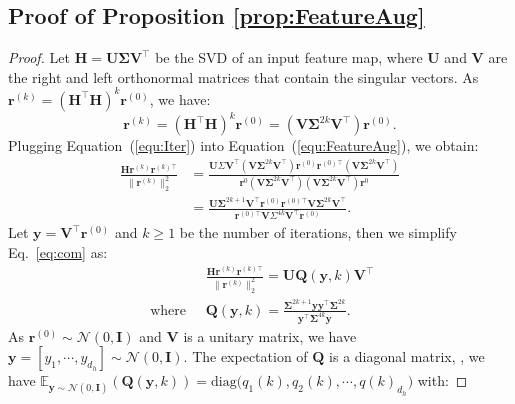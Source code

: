\setcounter{subsection}{1}
\subsection{Proof of Proposition \ref{prop:FeatureAug}}

\begin{proof}
Let $\mathbf{H} = \mathbf{U} \boldsymbol{\Sigma} \mathbf{V}^{\top}$ be the SVD of an input feature map, where $\mathbf{U}$ and $\mathbf{V}$ are the right and left orthonormal matrices that contain the singular vectors. As $\mathbf{r}^{(k)} = (\mathbf{H}^\top\mathbf{H})^k\mathbf{r}^{(0)}$, we have: %
\begin{equation}
    \mathbf{r}^{(k)} = (\mathbf{H}^\top\mathbf{H})^{k}\mathbf{r}^{(0)} = (\mathbf{V}\boldsymbol{\Sigma}^{2k} \mathbf{V}^{\top})\mathbf{r}^{(0)}.
    \label{equ:Iter}
\end{equation}
Plugging Equation~(\ref{equ:Iter}) into Equation~(\ref{equ:FeatureAug}), we obtain:
\begin{equation}
\begin{aligned}
        \!\!\!\!\frac{\mathbf{H} \mathbf{r}^{(k)} \mathbf{r}^{(k)\top}}{\|\mathbf{r}^{(k)}\|_2^2} &\!=\! \frac{\mathbf{U}\Sigma\mathbf{V}^\top (\mathbf{V}\boldsymbol{\Sigma}^{2k} \mathbf{V}^{\top})\mathbf{r}^{(0)} \mathbf{r}^{(0)\top}(\mathbf{V}\boldsymbol{\Sigma}^{2k} \mathbf{V}^{\top})}{\mathbf{r}^{0}(\mathbf{V}\boldsymbol{\Sigma}^{2k} \mathbf{V}^{\top})(\mathbf{V}\boldsymbol{\Sigma}^{2k} \mathbf{V}^{\top})\mathbf{r}^{0}}\\
        &\!=\! \frac{\mathbf{U}\boldsymbol{\Sigma}^{2k+1} \mathbf{V}^{\top}\mathbf{r}^{(0)} \mathbf{r}^{(0)\top}\mathbf{V}\boldsymbol{\Sigma}^{2k} \mathbf{V}^{\top}}{\mathbf{r}^{(0)\top}\mathbf{V} \Sigma^{4k} \mathbf{V}^{\top}\mathbf{r}^{(0)}}.\!\!
        \label{eq:com}
\end{aligned}
\end{equation}
Let $\mathbf{y} = \mathbf{V}^{\top}\mathbf{r}^{(0)}$ and $k\geq1$ be the number of iterations, then we simplify Eq.~\eqref{eq:com} as:
\begin{align}
        &\frac{\mathbf{H} \mathbf{r}^{(k)} \mathbf{r}^{(k)\top}}{\|\mathbf{r}^{(k)}\|_2^2} \!=\!\mathbf{U}\mathbf{Q}(\mathbf{y},k)\mathbf{V}^\top\\
        \text{ where }\;& \mathbf{Q}(\mathbf{y},k)\!=\!\frac{\boldsymbol{\Sigma}^{2k+1}\mathbf{y}\mathbf{y}^\top\boldsymbol{\Sigma}^{2k}}{\mathbf{y}^\top\boldsymbol{\Sigma}^{4k}\mathbf{y}}.
        \label{eq:sim}
\end{align}
As $\mathbf{r}^{(0)} \sim \mathcal{N}(0,\mathbf{I})$ and $\mathbf{V}$ is a unitary matrix, we have $\mathbf{y}=[y_1,\cdots,y_{d_h}]\sim\mathcal{N}(0, \mathbf{I})$. The expectation of $\mathbf{Q}$ %
is a diagonal matrix, \ie, we have $\mathbb{E}_{\mathbf{y}\sim\mathcal{N}(0, \mathbf{I})}(\mathbf{Q}(\mathbf{y},k)) = \text{diag}\big(q_1(k), q_2(k), \cdots, q(k)_{d_h}\big)$ with:


\end{proof}

